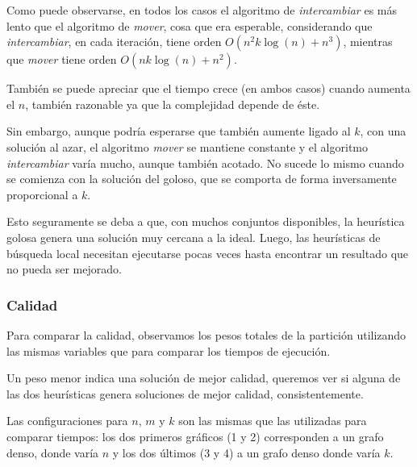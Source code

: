 \vspace*{0.75cm}


Como puede observarse, en todos los casos el algoritmo de \textit{intercambiar}
es más lento que el algoritmo de \textit{mover}, cosa que era esperable,
considerando que \textit{intercambiar}, en cada iteración, tiene orden
$O(n^2k\log(n) + n^3)$, mientras que \textit{mover} tiene orden $O(nk\log(n) +
n^2)$.

También se puede apreciar que el tiempo crece (en ambos casos) cuando aumenta
el $n$, también razonable ya que la complejidad depende de éste.

Sin embargo, aunque podría esperarse que también aumente ligado al $k$, con una
solución al azar, el algoritmo \textit{mover} se mantiene constante y el
algoritmo \textit{intercambiar} varía mucho, aunque también acotado. No sucede
lo mismo cuando se comienza con la solución del goloso, que se comporta
de forma inversamente proporcional a $k$.

Esto seguramente se deba a que, con muchos conjuntos disponibles, la heurística golosa genera una solución muy cercana a la ideal. Luego, las heurísticas de búsqueda local necesitan ejecutarse pocas veces hasta encontrar un resultado que no pueda ser mejorado.


\newpage \subsubsection{Calidad}

Para comparar la calidad, observamos los pesos totales de la partición
utilizando las mismas variables que para comparar los tiempos de ejecución.

Un peso menor indica una solución de mejor calidad, queremos ver si alguna
de las dos heurísticas genera soluciones de mejor calidad, consistentemente.

\vspace{0.25cm}

Las configuraciones para $n$, $m$ y $k$ son las mismas que las utilizadas para
comparar tiempos: los dos primeros gráficos (1 y 2) corresponden a un grafo denso, donde varía $n$ y los dos últimos (3 y 4) a un grafo denso donde varía $k$.

\vspace*{0.75cm}

